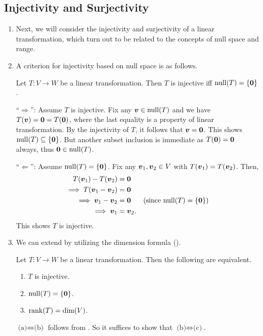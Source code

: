 \subsection{Injectivity and Surjectivity}
\begin{enumerate}
\item Next, we will consider the injectivity and surjectivity of a linear
transformation, which turn out to be related to the concepts of null space and
range.

\item A criterion for injectivity based on null space is as follows.

\begin{proposition}
\label{prp:inj-iff-null-sp-only-zero}
Let \(T:V\to W\) be a linear transformation. Then \(T\) is injective iff
\(\operatorname{null}(T)=\{\vb*{0}\}\).
\end{proposition}
\begin{pf}
``\(\Rightarrow\)'': Assume \(T\) is injective. Fix any \(\vb*{v}\in\operatorname{null}(T)\)
and we have \(T(\vb*{v})=\vb*{0}=T(\vb*{0})\), where the last equality is a
property of linear transformation. By the injectivity of \(T\), it follows that
\(\vb*{v}=\vb*{0}\). This shows \(\operatorname{null}(T)\subseteq \{\vb*{0}\}\). But
another subset inclusion is immediate as \(T(\vb*{0})=\vb*{0}\) always, thus
\(\vb*{0}\in\operatorname{null}(T)\).

``\(\Leftarrow\)'': Assume \(\operatorname{null}(T)=\{\vb*{0}\}\). Fix any
\(\vb*{v}_1,\vb*{v}_2\in V\) with \(T(\vb*{v}_1)=T(\vb*{v}_2)\). Then,
\begin{align*}
T(\vb*{v}_1)-T(\vb*{v}_2)&=\vb*{0} \\
\implies T(\vb*{v}_1-\vb*{v}_2)&=\vb*{0} \\
\implies \vb*{v}_1-\vb*{v}_2&=\vb*{0} &\text{(since \(\operatorname{null}(T)=\{\vb*{0}\}\))}\\
\implies \vb*{v}_1&=\vb*{v}_2.
\end{align*}
This shows \(T\) is injective.
\end{pf}

\item We can extend  by utilizing the
dimension formula ().

\begin{theorem}
\label{thm:lin-tran-inj-crit}
Let \(T:V\to W\) be a linear transformation. Then the following are equivalent.
\begin{enumerate}
\item \(T\) is injective.
\item \(\operatorname{null}(T)=\{\vb*{0}\}\).
\item \(\operatorname{rank}(T)=\dim(V)\).
\end{enumerate}
\end{theorem}
\begin{pf}
\(\text{(a)}\iff \text{(b)}\) follows from
. So it suffices to show that
\(\text{(b)}\iff\text{(c)}\).


\end{pf}
\end{enumerate}
